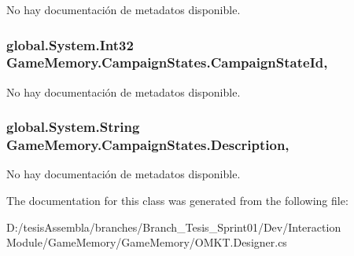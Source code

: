No hay documentación de metadatos disponible. 

\hypertarget{class_game_memory_1_1_campaign_states_a601afd4dcdde9340518a610a55469580}{
\subsubsection[{Campaign\-State\-Id}]{\setlength{\rightskip}{0pt plus 5cm}global.\-System.\-Int32 Game\-Memory.\-Campaign\-States.\-Campaign\-State\-Id\hspace{0.3cm}{\ttfamily [get]}, {\ttfamily [set]}}}\label{class_game_memory_1_1_campaign_states_a601afd4dcdde9340518a610a55469580}


No hay documentación de metadatos disponible. 

\hypertarget{class_game_memory_1_1_campaign_states_a4f99ca8ca1805ffe03998685fae7913c}{
\subsubsection[{Description}]{\setlength{\rightskip}{0pt plus 5cm}global.\-System.\-String Game\-Memory.\-Campaign\-States.\-Description\hspace{0.3cm}{\ttfamily [get]}, {\ttfamily [set]}}}\label{class_game_memory_1_1_campaign_states_a4f99ca8ca1805ffe03998685fae7913c}


No hay documentación de metadatos disponible. 



The documentation for this class was generated from the following file\-:\begin{DoxyCompactItemize}
\item 
D\-:/tesis\-Assembla/branches/\-Branch\-\_\-\-Tesis\-\_\-\-Sprint01/\-Dev/\-Interaction Module/\-Game\-Memory/\-Game\-Memory/O\-M\-K\-T.\-Designer.\-cs\end{DoxyCompactItemize}
